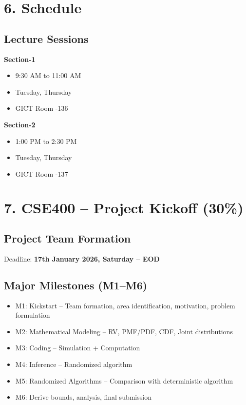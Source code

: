 \documentclass[11pt]{article}
\begin{document}
\section*{6. Schedule}

\subsection*{Lecture Sessions}

\textbf{Section-1}
\begin{itemize}
    \item 9:30 AM to 11:00 AM
    \item Tuesday, Thursday
    \item GICT Room -136
\end{itemize}

\textbf{Section-2}
\begin{itemize}
    \item 1:00 PM to 2:30 PM
    \item Tuesday, Thursday
    \item GICT Room -137
\end{itemize}

\section*{7. CSE400 – Project Kickoff (30\%)}

\subsection*{Project Team Formation}

Deadline: \textbf{17th January 2026, Saturday – EOD}

\subsection*{Major Milestones (M1–M6)}

\begin{itemize}
    \item M1: Kickstart – Team formation, area identification, motivation, problem formulation
    \item M2: Mathematical Modeling – RV, PMF/PDF, CDF, Joint distributions
    \item M3: Coding – Simulation + Computation
    \item M4: Inference – Randomized algorithm
    \item M5: Randomized Algorithms – Comparison with deterministic algorithm
    \item M6: Derive bounds, analysis, final submission
\end{itemize}
\end{document}
